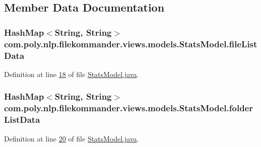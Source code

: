 \subsection{Member Data Documentation}
\hypertarget{classcom_1_1poly_1_1nlp_1_1filekommander_1_1views_1_1models_1_1_stats_model_a7f136c002fe9865658d95f070a47fc10}{
\subsubsection[{file\-List\-Data}]{\setlength{\rightskip}{0pt plus 5cm}Hash\-Map$<$String, String$>$ com.\-poly.\-nlp.\-filekommander.\-views.\-models.\-Stats\-Model.\-file\-List\-Data\hspace{0.3cm}{\ttfamily [private]}}}\label{classcom_1_1poly_1_1nlp_1_1filekommander_1_1views_1_1models_1_1_stats_model_a7f136c002fe9865658d95f070a47fc10}


Definition at line \hyperlink{L18}{18} of file \hyperlink{}{Stats\-Model.\-java}.

\hypertarget{classcom_1_1poly_1_1nlp_1_1filekommander_1_1views_1_1models_1_1_stats_model_af8cefc08e228065ab54db3f1f9db7b9e}{
\subsubsection[{folder\-List\-Data}]{\setlength{\rightskip}{0pt plus 5cm}Hash\-Map$<$String, String$>$ com.\-poly.\-nlp.\-filekommander.\-views.\-models.\-Stats\-Model.\-folder\-List\-Data\hspace{0.3cm}{\ttfamily [private]}}}\label{classcom_1_1poly_1_1nlp_1_1filekommander_1_1views_1_1models_1_1_stats_model_af8cefc08e228065ab54db3f1f9db7b9e}


Definition at line \hyperlink{L20}{20} of file \hyperlink{}{Stats\-Model.\-java}.

